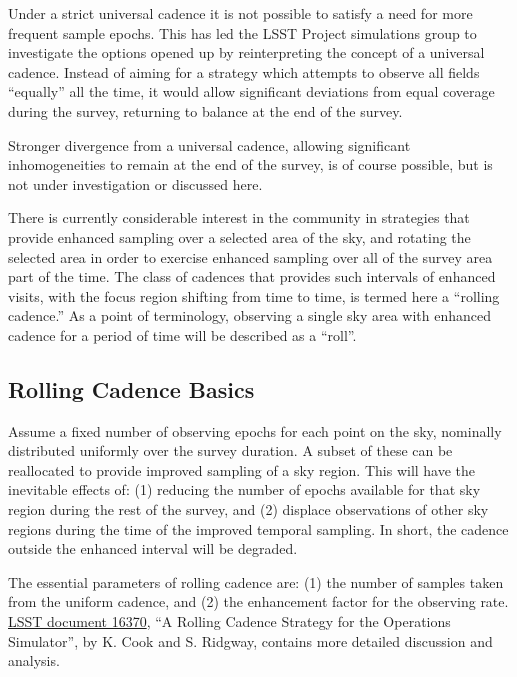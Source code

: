 Under a strict universal cadence it is not possible to satisfy a need
for more frequent sample epochs.  This has led the LSST Project
simulations group to investigate the options opened up by reinterpreting
the concept of a universal cadence.  Instead of aiming for a strategy
which attempts to observe all fields ``equally'' all the time, it would
allow significant deviations from equal coverage during the survey,
returning to balance at the end of the survey.

Stronger divergence from a universal cadence, allowing significant
inhomogeneities to remain at the end of the survey, is of course
possible, but is not under investigation or discussed here.

There is currently considerable interest in the community in strategies
that provide enhanced sampling over a selected area of the sky, and
rotating the selected area in order to exercise enhanced sampling over
all of the survey area part of the time.  The class of cadences that
provides such intervals of enhanced visits, with the focus region
shifting from time to time, is termed here a ``rolling cadence.''  As a
point of terminology, observing a single sky area with enhanced cadence
for a period of time will be described as a ``roll''.


\subsection{Rolling Cadence Basics}

Assume a fixed number of observing epochs for each point on the sky,
nominally distributed uniformly over the survey duration.  A subset of
these can be reallocated to provide improved sampling of a sky region.
This will have the inevitable effects of: (1) reducing the number of
epochs available for that sky region during the rest of the survey, and
(2) displace observations of other sky regions during the time of the
improved temporal sampling.  In short, the cadence outside the enhanced
interval will be degraded.

The essential parameters of rolling cadence are: (1) the number of
samples taken from the uniform cadence, and (2) the enhancement factor
for the observing rate.
\href{https://project.lsst.org/meetings/ocw/sites/lsst.org.meetings.ocw/files/OpSim%20Rolling%20Cadence%20Stratgey-ver1.3.pdf}{LSST document 16370},
``A Rolling Cadence Strategy for the Operations Simulator'', by K. Cook
and S. Ridgway, contains more detailed discussion and analysis.

